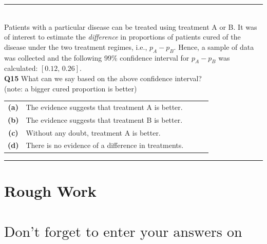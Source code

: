 \documentclass[12pt]{article}
\begin{document}
\rule{\linewidth}{1pt}
\quad\\
Patients with a particular disease can be treated using treatment A or B. It was of interest to estimate the \emph{difference} in proportions of patients cured of the disease under the two treatment regimes, i.e., $p_A - p_B$. Hence, a sample of data was collected and the following 99\% confidence interval for $p_A - p_B$ was calculated: $[0.12,\,0.26]$.\\[0.2cm]

{\bf Q15} What can we say based on the above confidence interval?\\
(note: a bigger cured proportion is better)\\[0.2cm]
\begin{tabular}{c@{\,\,\,}llll}
{\bf(a)} & The evidence suggests that treatment A is better.\\[0.2cm]
{\bf(b)} & The evidence suggests that treatment B is better. \\[0.2cm]
{\bf(c)} & Without any doubt, treatment A is better. \\[0.2cm]
{\bf(d)} & There is no evidence of a difference in treatments. \\[0.6cm]
\end{tabular}


\rule{\linewidth}{1pt}







\newpage

\section*{Rough Work\\[23cm]}
\section*{\hspace{2cm}$\boxed{\text{Don't forget to enter your answers on the last page!}}$}

\newpage
\end{document}
